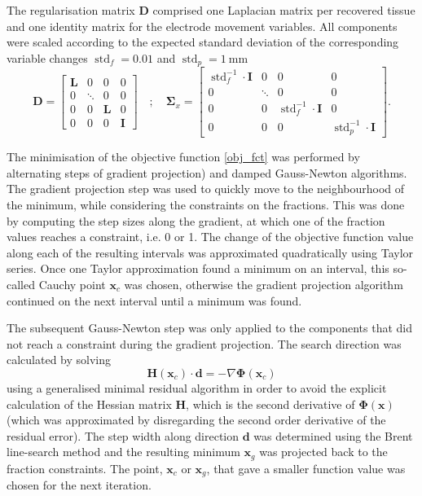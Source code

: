 The regularisation matrix $\mathbf{D}$ comprised one Laplacian matrix per recovered tissue and one identity matrix for the electrode movement variables. All components were scaled according to the expected standard deviation of the corresponding variable changes $\operatorname{std}_f = 0.01$ and $\operatorname{std}_p = \SI{1}{\milli\metre}$
\begin{equation}
\mathbf{D} = \begin{bmatrix} \mathbf{L} & 0 & 0 & 0 \\
							 0 & \ddots & 0 & 0 \\ 
							 0 & 0 & \mathbf{L} & 0 \\
							 0 & 0 & 0 & \mathbf{I}
			 \end{bmatrix} \quad;\quad 
\mathbf{\Sigma}_x = \begin{bmatrix} \operatorname{std}_f^{-1} \cdot \mathbf{I} & 0 & 0 & 0 \\
							 		0 & \ddots & 0 & 0 \\ 
							 		0 & 0 & \operatorname{std}_f^{-1} \cdot \mathbf{I} & 0 \\
							 		0 & 0 & 0 & \operatorname{std}_p^{-1} \cdot \mathbf{I}
			 		\end{bmatrix}.
\end{equation}

The minimisation of the objective function \eqref{obj_fct} was performed by alternating steps of gradient projection) and damped Gauss-Newton algorithms. The gradient projection \citep{Nocedal1999} step was used to quickly move to the neighbourhood of the minimum, while considering the constraints on the fractions. This was done by computing the step sizes along the gradient, at which one of the fraction values reaches a constraint, i.e. 0 or 1. The change of the objective function value along each of the resulting intervals was approximated quadratically using Taylor series. Once one Taylor approximation found a minimum on an interval, this so-called Cauchy point $\boldsymbol{x}_c$ was chosen, otherwise the gradient projection algorithm continued on the next interval until a minimum was found.

The subsequent Gauss-Newton step was only applied to the components that did not reach a constraint during the gradient projection. The search direction was calculated by solving
\begin{equation}
\mathbf{H}(\boldsymbol{x}_c) \cdot \boldsymbol{d} = - \nabla \boldsymbol{\Phi}(\boldsymbol{x}_c)
\end{equation}
using a generalised minimal residual algorithm in order to avoid the explicit calculation of the Hessian matrix $\mathbf{H}$, which is the second derivative of $\boldsymbol{\Phi}(\boldsymbol{x})$ (which was approximated by disregarding the second order derivative of the residual error). The step width along direction $\boldsymbol{d}$ was determined using the Brent line-search method \citep{Brent1973} and the resulting minimum $\boldsymbol{x}_g$ was projected back to the fraction constraints. The point, $\boldsymbol{x}_c$ or $\boldsymbol{x}_g$, that gave a smaller function value was chosen for the next iteration.


